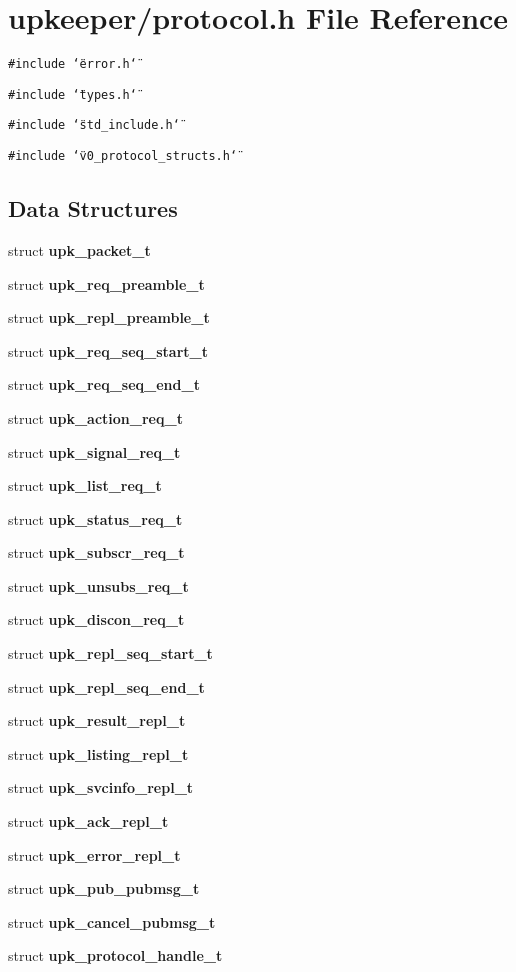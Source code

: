 \section{upkeeper/protocol.h File Reference}
\label{protocol_8h}
{\tt \#include \char`\"{}error.h\char`\"{}}\par
{\tt \#include \char`\"{}types.h\char`\"{}}\par
{\tt \#include \char`\"{}std\_\-include.h\char`\"{}}\par
{\tt \#include \char`\"{}v0\_\-protocol\_\-structs.h\char`\"{}}\par
\subsection*{Data Structures}
\begin{CompactItemize}
\item 
struct \bf{upk\_\-packet\_\-t}
\item 
struct \bf{upk\_\-req\_\-preamble\_\-t}
\item 
struct \bf{upk\_\-repl\_\-preamble\_\-t}
\item 
struct \bf{upk\_\-req\_\-seq\_\-start\_\-t}
\item 
struct \bf{upk\_\-req\_\-seq\_\-end\_\-t}
\item 
struct \bf{upk\_\-action\_\-req\_\-t}
\item 
struct \bf{upk\_\-signal\_\-req\_\-t}
\item 
struct \bf{upk\_\-list\_\-req\_\-t}
\item 
struct \bf{upk\_\-status\_\-req\_\-t}
\item 
struct \bf{upk\_\-subscr\_\-req\_\-t}
\item 
struct \bf{upk\_\-unsubs\_\-req\_\-t}
\item 
struct \bf{upk\_\-discon\_\-req\_\-t}
\item 
struct \bf{upk\_\-repl\_\-seq\_\-start\_\-t}
\item 
struct \bf{upk\_\-repl\_\-seq\_\-end\_\-t}
\item 
struct \bf{upk\_\-result\_\-repl\_\-t}
\item 
struct \bf{upk\_\-listing\_\-repl\_\-t}
\item 
struct \bf{upk\_\-svcinfo\_\-repl\_\-t}
\item 
struct \bf{upk\_\-ack\_\-repl\_\-t}
\item 
struct \bf{upk\_\-error\_\-repl\_\-t}
\item 
struct \bf{upk\_\-pub\_\-pubmsg\_\-t}
\item 
struct \bf{upk\_\-cancel\_\-pubmsg\_\-t}
\item 
struct \bf{upk\_\-protocol\_\-handle\_\-t}
\end{CompactItemize}
